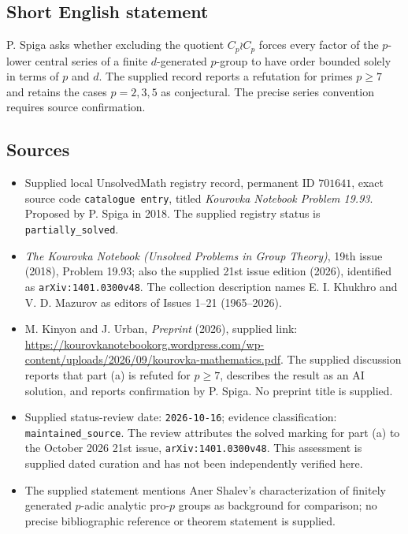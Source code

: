 \documentclass[11pt]{article}
\begin{document}
\subsection{Short English statement}
P. Spiga asks whether excluding the quotient \(C_p\wr C_p\) forces every factor of the \(p\)-lower central series of a finite \(d\)-generated \(p\)-group to have order bounded solely in terms of \(p\) and \(d\). The supplied record reports a refutation for primes \(p\geq7\) and retains the cases \(p=2,3,5\) as conjectural. The precise series convention requires source confirmation.
\subsection{Sources}
\begin{itemize}
\item Supplied local UnsolvedMath registry record, permanent ID \(701641\), exact source code \texttt{catalogue entry}, titled \emph{Kourovka Notebook Problem 19.93}. Proposed by P. Spiga in 2018. The supplied registry status is \texttt{partially\_solved}.
\item \emph{The Kourovka Notebook (Unsolved Problems in Group Theory)}, 19th issue (2018), Problem 19.93; also the supplied 21st issue edition (2026), identified as \texttt{arXiv:1401.0300v48}. The collection description names E. I. Khukhro and V. D. Mazurov as editors of Issues 1--21 (1965--2026).
\item M. Kinyon and J. Urban, \emph{Preprint} (2026), supplied link: \url{https://kourovkanotebookorg.wordpress.com/wp-content/uploads/2026/09/kourovka-mathematics.pdf}. The supplied discussion reports that part (a) is refuted for \(p\geq7\), describes the result as an AI solution, and reports confirmation by P. Spiga. No preprint title is supplied.
\item Supplied status-review date: \texttt{2026-10-16}; evidence classification: \texttt{maintained\_source}. The review attributes the solved marking for part (a) to the October 2026 21st issue, \texttt{arXiv:1401.0300v48}. This assessment is supplied dated curation and has not been independently verified here.
\item The supplied statement mentions Aner Shalev's characterization of finitely generated \(p\)-adic analytic pro-\(p\) groups as background for comparison; no precise bibliographic reference or theorem statement is supplied.
\end{itemize}
\end{document}
